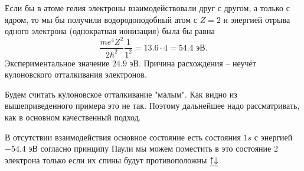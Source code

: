 Если бы в атоме гелия электроны взаимодействовали друг с другом, а только с ядром, то мы бы получили водородоподобный атом с $Z = 2$ и энергией отрыва одного электрона (однократная ионизация) была бы равна 
\begin{equation*}
	\frac{m e^4 Z^2}{2 \hbar^2} \frac{1}{1^2} = 13.6 \cdot 4 = 54.4 \text{ эВ}.
\end{equation*}
Экспериментальное значение $24.9$ эВ. Причина расхождения -- неучёт  кулоновского отталкивания электронов.

Будем считать кулоновское отталкивание "малым". Как видно из вышеприведенного примера это не так. Поэтому дальнейшее надо рассматривать, как в основном качественный подход.

В отсутствии взаимодействия основное состояние есть состояния $1s$ с энергией $-54.4$ эВ согласно принципу Паули мы можем поместить в это состояние 2 электрона только если их спины будут противоположны $\sout{\uparrow \downarrow}$